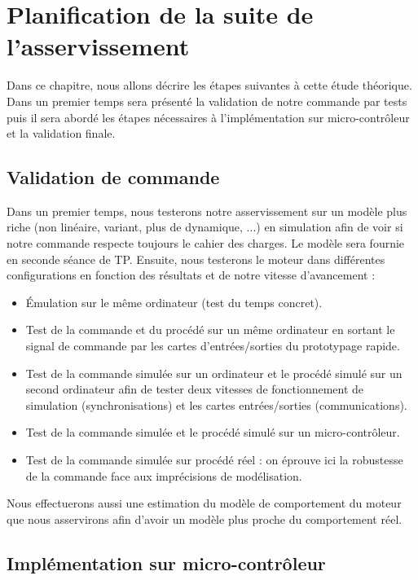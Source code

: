 \chapter{Planification de la suite de l'asservissement}
\label{chap:suite}
Dans ce chapitre, nous allons décrire les étapes suivantes à cette étude théorique. Dans un premier temps sera présenté la validation de notre commande par tests puis il sera abordé les étapes nécessaires à l'implémentation sur micro-contrôleur et la validation finale.
\section{Validation de commande}
Dans un premier temps, nous testerons notre asservissement sur un modèle plus riche (non linéaire, variant, plus de dynamique, ...) en simulation afin de voir si notre commande respecte toujours le cahier des charges. Le modèle sera fournie en seconde séance de TP. Ensuite, nous testerons le moteur dans différentes configurations en fonction des résultats et de notre vitesse d'avancement : 
\begin{itemize}
\item Émulation sur le même ordinateur (test du temps concret).
\item Test de la commande et du procédé sur un même ordinateur en sortant le signal de commande par les cartes d'entrées/sorties du prototypage rapide.
\item Test de la commande simulée sur un ordinateur et le procédé simulé sur un second ordinateur afin de tester deux vitesses de fonctionnement de simulation (synchronisations) et les cartes entrées/sorties (communications).
\item Test de la commande simulée et le procédé simulé sur un micro-contrôleur.
\item Test de la commande simulée sur procédé réel : on éprouve ici la robustesse de la commande face aux imprécisions de modélisation.
\end{itemize}
Nous effectuerons aussi une estimation du modèle de comportement du moteur que nous asservirons afin d'avoir un modèle plus proche du comportement réel.
\section{Implémentation sur micro-contrôleur}

